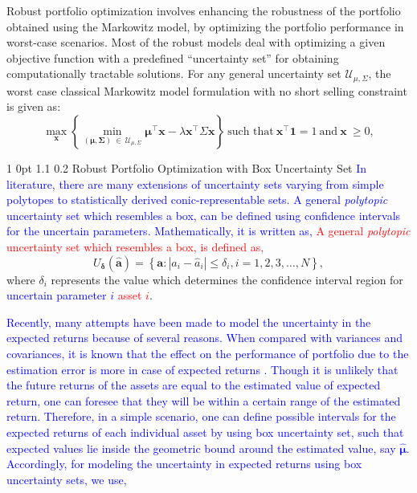 \documentclass[12pt]{article}
\makeatletter
\numberwithin{equation}{section}
\renewcommand{\subsection}{
  \@startsection
  {subsection}%
  {1}%
  {0pt}%
  {1.1\baselineskip}%
  {0.2\baselineskip}%
  {\sc \centering}%
}
\makeatother
\begin{document}
Robust portfolio optimization involves enhancing the robustness of the portfolio obtained using the Markowitz model, by optimizing the portfolio performance in worst-case scenarios. Most of the robust models deal with optimizing a given objective function with a predefined ``uncertainty set'' for obtaining computationally tractable solutions. For any general uncertainty set $\displaystyle{\mathcal{U}_{\mu,\Sigma}}$, the worst case classical Markowitz model formulation \cite{Halldorsson03,Kim14} with no short selling constraint is given as:
\begin{equation}
\label{eq:worst_case_classical_markowitz}
\max\limits_{\mathbf{x}}\left\{\min\limits_{\left(\boldsymbol{\mu},\boldsymbol{\Sigma}\right)~\in~\mathcal{U}_{\mu,\Sigma}}\boldsymbol{\mu}^{\top}\mathbf{x}
-\lambda\mathbf{x^{\top}}\Sigma\mathbf{x}\right\}~\text{such that}~\mathbf{x^{\top}}\mathbf{1}=1~\text{and}~\mathbf{x}~\geq 0,
\end{equation}

\subsection{Robust Portfolio Optimization with Box Uncertainty Set}
\textcolor{blue}{In literature, there are many extensions of uncertainty sets varying from simple polytopes to statistically derived conic-representable sets. A general \textit{polytopic} \cite{Fabozzi07} uncertainty set which resembles a box, can be defined using confidence intervals for the uncertain parameters. Mathematically, it is written as,}
\textcolor{red}{A general \textit{polytopic} \cite{Fabozzi07} uncertainty set which resembles a box, is defined as,}
\begin{equation}
\label{eqn:box_1}
U_{\boldsymbol{\delta}}(\mathbf{\hat{a}})=\left\{\mathbf{a}:\left|a_{i}-\hat{a}_{i}\right| \leq \delta_{i}, i=1,2,3,\dots,N\right\},
\end{equation}
where $\delta_{i}$ represents the value which determines the confidence interval region for \textcolor{blue}{uncertain parameter $i$} \textcolor{red}{asset $i$}.

\textcolor{blue}{Recently, many attempts have been made to model the uncertainty in the expected returns because of several reasons. When compared with variances and covariances, it is known that the effect on the performance of portfolio due to the estimation error is more in case of expected returns \cite{Chopra93}. Though it is unlikely that the future returns of the assets are equal to the estimated value of expected return, one can foresee that they will be within a certain range of the estimated return. Therefore, in a simple scenario, one can define possible intervals for the expected returns of each individual asset by using box uncertainty set, such that expected values lie inside the geometric bound around the estimated value, say $\boldsymbol{\hat{\mu}}$. Accordingly, for modeling the uncertainty in expected returns using box uncertainty sets, we use,}
\end{document}
